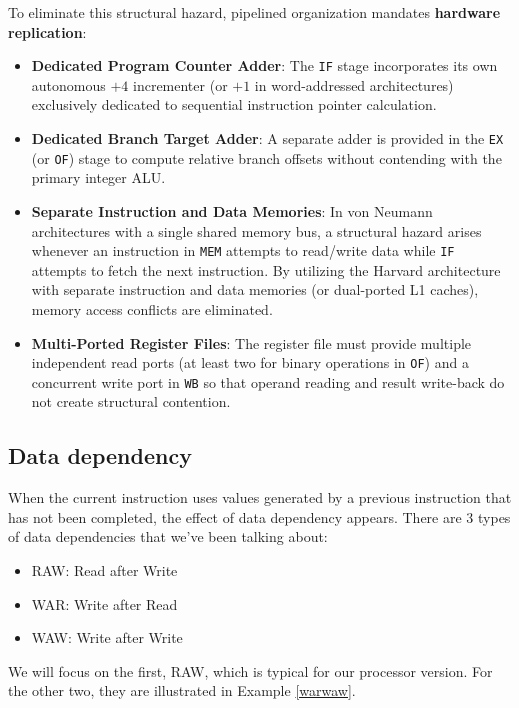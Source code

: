 To eliminate this structural hazard, pipelined organization mandates \textbf{hardware replication}:
\begin{itemize}
    \item \textbf{Dedicated Program Counter Adder}: The \texttt{IF} stage incorporates its own autonomous $+4$ incrementer (or $+1$ in word-addressed architectures) exclusively dedicated to sequential instruction pointer calculation.
    \item \textbf{Dedicated Branch Target Adder}: A separate adder is provided in the \texttt{EX} (or \texttt{OF}) stage to compute relative branch offsets without contending with the primary integer ALU.
    \item \textbf{Separate Instruction and Data Memories}: In von Neumann architectures with a single shared memory bus, a structural hazard arises whenever an instruction in \texttt{MEM} attempts to read/write data while \texttt{IF} attempts to fetch the next instruction. By utilizing the Harvard architecture with separate instruction and data memories (or dual-ported L1 caches), memory access conflicts are eliminated.
    \item \textbf{Multi-Ported Register Files}: The register file must provide multiple independent read ports (at least two for binary operations in \texttt{OF}) and a concurrent write port in \texttt{WB} so that operand reading and result write-back do not create structural contention.
\end{itemize}

\subsection{Data dependency}

When the current instruction uses values generated by a previous instruction that has not been completed, the effect of data dependency appears. There are 3 types of data dependencies that
we’ve been talking about:
\begin{itemize}
\item RAW: Read after Write
\item WAR: Write after Read
\item WAW: Write after Write
\end{itemize}
We will focus on the first, RAW, which is typical for our processor version. For the other two, they are illustrated in Example \ref{warwaw}.

